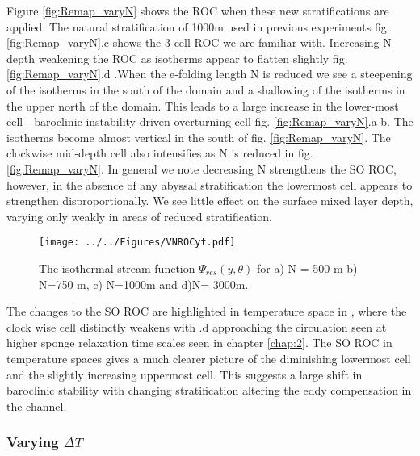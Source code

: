 Figure \ref{fig:Remap_varyN} shows the ROC when these new stratifications are applied. The natural stratification of 1000m used in previous experiments fig. \ref{fig:Remap_varyN}.c shows the 3 cell ROC we are familiar with. Increasing N depth weakening the ROC as isotherms appear to flatten slightly fig. \ref{fig:Remap_varyN}.d .When the e-folding length N is reduced we see a steepening of the isotherms in the south of the domain and a shallowing of the isotherms in the upper north of the domain. This leads to a large increase in the lower-most cell - baroclinic instability driven overturning cell fig. \ref{fig:Remap_varyN}.a-b. The isotherms become almost vertical in the south of fig. \ref{fig:Remap_varyN}. The clockwise mid-depth cell also intensifies as N is reduced in fig. \ref{fig:Remap_varyN}. In general we note decreasing N strengthens the SO ROC, however, in the absence of any abyssal stratification the lowermost cell appears to strengthen disproportionally. We see little effect on the surface mixed layer depth, varying only weakly in areas of reduced stratification.
\begin{figure}[H]
\center
\noindent \texttt{[image: ../../Figures/VNROCyt.pdf]}
\caption{The isothermal stream function $\Psi_{res}(y,\theta)$ for a) N = 500 m  b) N=750 m, c) N=1000m and d)N= 3000m. }
\label{fig:ROCTvaryN}
\end{figure}
The changes to the SO ROC are highlighted in temperature space in , where the clock wise cell distinctly weakens with .d approaching the circulation seen at higher sponge relaxation time scales seen in chapter \ref{chap:2}. The SO ROC in temperature spaces gives a much clearer picture of the diminishing lowermost cell and the slightly increasing uppermost cell. This suggests a large shift in baroclinic stability with changing stratification altering the eddy compensation in the channel. 

\subsubsection*{Varying $\Delta T$}

